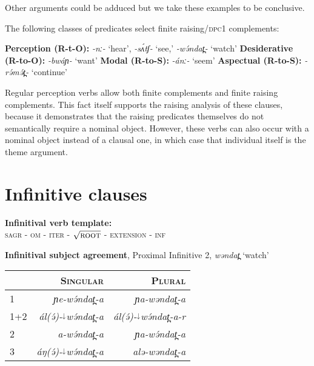 Other arguments could be adduced but we take these examples to be conclusive.

The following classes of predicates select finite raising/\textsc{dpc1} complements:

\ea 
\ea  \textbf{Perception (R-t-O):} \textit{-nː-} `hear', \textit{-sʌ́tʃ-} `see,' \textit{-wə́ndat̪-} `watch'
\ex \textbf{Desiderative (R-to-O):} \textit{-bwáɲ-} `want'
\ex \textbf{Modal (R-to-S):} \textit{-ánː-} `seem' 
\ex \textbf{Aspectual (R-to-S):} \textit{-rə́mə́t̪-} `continue'
\z 
\z 

Regular perception verbs allow both finite complements and finite raising complements. This fact itself supports the raising analysis of these clauses, because it demonstrates that the raising predicates themselves do not semantically require a nominal object. However, these verbs can also occur with a nominal object instead of a clausal one, in which case that individual itself is the theme argument.

\section{Infinitive clauses}\label{sec:ch15:infinitives}

\ea \textbf{Infinitival verb template:} \\
\textsc{sagr} - \textsc{om} - \textsc{iter} - $\sqrt{\textsc{root}}$ - \textsc{extension} - \textsc{inf}
\z 


\ea \textbf{Infinitival subject agreement}, Proximal Infinitive 2,  \textit{wəndat̪} `watch'  \citep{rose13}\\
\begin{tabular}[l]{lrr}
\hline
	& \textsc{Singular} 				& \textsc{Plural} \\
\hline
1 	& \textit{ɲe-wə́ndat̪-a} 			&  \textit{ɲa-wəndat̪-a} \\
1+2 	& \textit{ál(ə́)-$^{↓}$wə́ndat̪-a} 		& \textit{ál(ə́)-$^{↓}$wə́ndat̪-a-r} \\
2 	& \textit{a-wə́ndat̪-a} 			&  \textit{ɲa-wə́ndat̪-a}\\
3 	& \textit{áŋ(ə́)-$^{↓}$wə́ndat̪-a} 	&  \textit{alə-wəndat̪-a} \\
\hline
\end{tabular}
\z 


